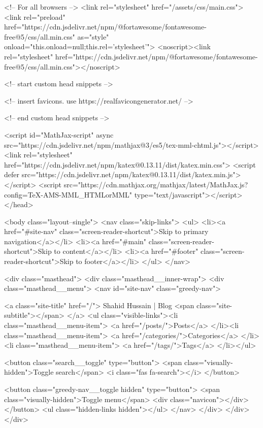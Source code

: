 <!-- For all browsers -->
<link rel="stylesheet" href="/assets/css/main.css">
<link rel="preload" href="https://cdn.jsdelivr.net/npm/@fortawesome/fontawesome-free@5/css/all.min.css" as="style" onload="this.onload=null;this.rel='stylesheet'">
<noscript><link rel="stylesheet" href="https://cdn.jsdelivr.net/npm/@fortawesome/fontawesome-free@5/css/all.min.css"></noscript>



    <!-- start custom head snippets -->

<!-- insert favicons. use https://realfavicongenerator.net/ -->

<!-- end custom head snippets -->


    <script id="MathJax-script" async src="https://cdn.jsdelivr.net/npm/mathjax@3/es5/tex-mml-chtml.js"></script>
    <link rel="stylesheet" href="https://cdn.jsdelivr.net/npm/katex@0.13.11/dist/katex.min.css">
    <script defer src="https://cdn.jsdelivr.net/npm/katex@0.13.11/dist/katex.min.js"></script>
    <script src="https://cdn.mathjax.org/mathjax/latest/MathJax.js?config=TeX-AMS-MML_HTMLorMML" type="text/javascript"></script>
  </head>

  <body class="layout--single">
    <nav class="skip-links">
  <ul>
    <li><a href="#site-nav" class="screen-reader-shortcut">Skip to primary navigation</a></li>
    <li><a href="#main" class="screen-reader-shortcut">Skip to content</a></li>
    <li><a href="#footer" class="screen-reader-shortcut">Skip to footer</a></li>
  </ul>
</nav>

    

<div class="masthead">
  <div class="masthead__inner-wrap">
    <div class="masthead__menu">
      <nav id="site-nav" class="greedy-nav">
        
        <a class="site-title" href="/">
          Shahid Hussain | Blog
          <span class="site-subtitle"></span>
        </a>
        <ul class="visible-links"><li class="masthead__menu-item">
              <a href="/posts/">Posts</a>
            </li><li class="masthead__menu-item">
              <a href="/categories/">Categories</a>
            </li><li class="masthead__menu-item">
              <a href="/tags/">Tags</a>
            </li></ul>
        
        <button class="search__toggle" type="button">
          <span class="visually-hidden">Toggle search</span>
          <i class="fas fa-search"></i>
        </button>
        
        <button class="greedy-nav__toggle hidden" type="button">
          <span class="visually-hidden">Toggle menu</span>
          <div class="navicon"></div>
        </button>
        <ul class="hidden-links hidden"></ul>
      </nav>
    </div>
  </div>
</div>


